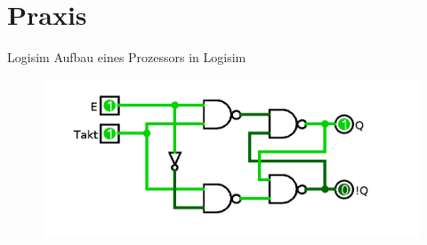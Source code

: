 \documentclass{beamer}
\begin{document}
\section{Praxis}
\begin{frame}{Logisim}
Aufbau eines Prozessors in Logisim
\begin{figure}[!htb]
\centering
\includegraphics[scale=0.30]{flipflop}
\end{figure}
\end{frame}
\end{document}
